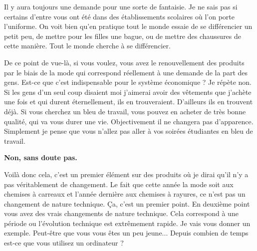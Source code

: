 \begin{small}
Il y aura toujours une demande pour une sorte de fantaisie. Je ne sais pas si certains d'entre vous ont été dans des établissements scolaires où l'on porte l'uniforme. On voit bien  qu'en pratique tout le monde essaie de se différencier un petit peu, de mettre pour les filles une bague, ou de mettre des chaussures de cette manière. Tout le monde cherche à se différencier. 

De ce point de vue-là, si vous voulez, vous avez le renouvellement des produits par le biais de la mode qui correspond réellement à une demande de la part des gens. Est-ce que c'est indispensable pour le système économique ? Je répète non. Si les gens d'un seul coup disaient \og   moi j'aimerai avoir des vêtements que j’achète une fois et qui durent éternellement\fg{}, ils en trouveraient. D'ailleurs ils en trouvent déjà. Si vous cherchez un bleu de travail, vous pouvez en acheter de très bonne qualité,  qui va vous durer une vie. Objectivement il ne changera pas d'apparence. Simplement je pense que vous n'allez pas aller à vos soirées étudiantes en bleu de travail.

\smallbreak\textbf{Non, sans doute pas.}\smallbreak


Voilà donc  cela,  c'est un premier élément sur des produits où je dirai qu'il n'y a pas véritablement de changement. Le fait que cette année la mode soit aux chemises à carreaux et l'année dernière aux chemises à rayures, ce n'est pas un changement de nature technique. Ça, c'est un premier point.  En deuxième point vous avez des vrais changements de nature technique. Cela correspond à une période ou l'évolution technique est extrêmement rapide. Je vais vous donner un exemple. Peut-être que vous vous êtes un peu jeune... Depuis combien de temps est-ce que vous utilisez un ordinateur ?


\end{small}
